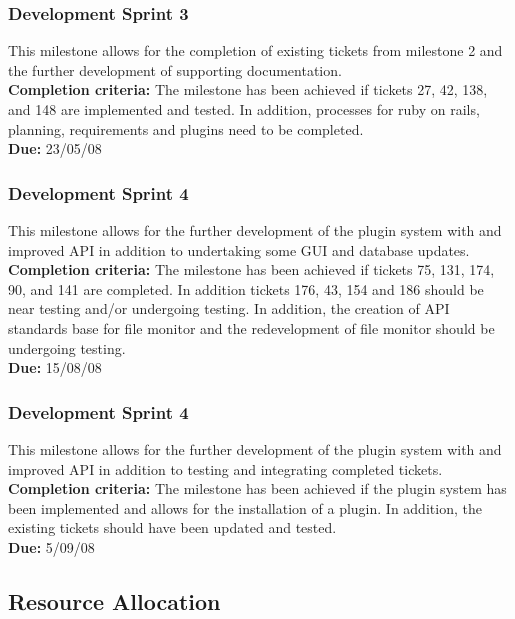 \documentclass{article}
\begin{document}
\subsubsection{Development Sprint 3}

This milestone allows for the completion of existing tickets from milestone 2 and the further development of supporting documentation. \\
\textbf{Completion criteria:} The milestone has been achieved if tickets 27, 42, 138, and 148 are implemented and tested. In addition, processes for ruby on rails, planning, requirements and plugins need to be completed.
\\
\textbf{Due:} 23/05/08

\subsubsection{Development Sprint 4}

This milestone allows for the further development of the plugin system with and improved API in addition to undertaking some GUI and database updates. \\
\textbf{Completion criteria:} The milestone has been achieved if tickets 75, 131, 174, 90, and 141 are completed. In addition tickets 176, 43, 154 and 186 should be near testing and/or undergoing testing. In addition, the creation of API standards base for file monitor and the redevelopment of file monitor should be undergoing testing.
\\
\textbf{Due:} 15/08/08

\subsubsection{Development Sprint 4}

This milestone allows for the further development of the plugin system with and improved API in addition to testing and integrating completed tickets. \\
\textbf{Completion criteria:} The milestone has been achieved if the plugin system has been implemented and allows for the installation of a plugin. In addition, the existing tickets should have been updated and tested.
\\
\textbf{Due:} 5/09/08

\subsection{Resource Allocation}
\end{document}
